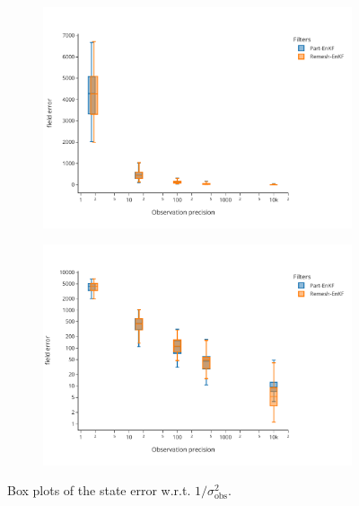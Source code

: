 \begin{figure}[h!]
    \centering
    \begin{subfigure}{0.49\linewidth}
        \centering
        \includegraphics[width=\linewidth]{./images/app2d/final/MSE_obs_precision_box.pdf}
        \caption{}
        \label{fig:obs_precision_1}
    \end{subfigure}
    \begin{subfigure}{0.49\linewidth}
        \centering
        \includegraphics[width=\linewidth]{./images/app2d/final/MSE_obs_precision_box_log.pdf}
        \caption{}
        \label{fig:obs_precision_2}
    \end{subfigure}
    \caption{Box plots of the state error w.r.t. $1/\sigma_{\text{obs}}^2$.}
\end{figure}


